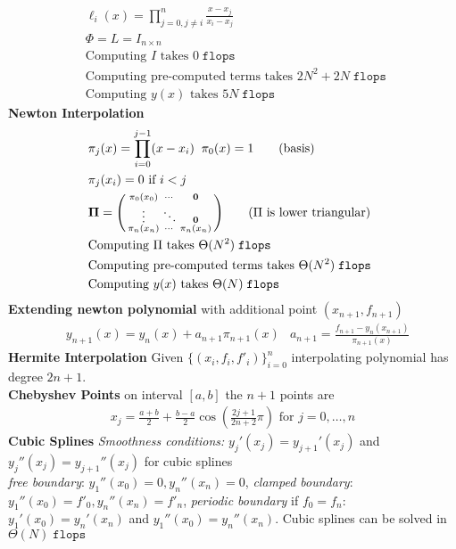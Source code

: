 \documentclass[letter, fleqn]{article}
\newcommand{\flops}{\texttt{flops }}
\begin{document}
\begin{multicols}{3}
\begin{align*}
        &\ell_i(x) = \prod_{j=0, j\neq i}^n \frac{x-x_j}{x_i-x_j} \tag{basis}\\
        &\Phi = L = I_{n\times n} \\
        &\text{Computing $I$ takes $0 \;\flops$}\\
        &\text{Computing pre-computed terms takes $2N^2 + 2N \;\flops$}\\
        &\text{Computing $y(x)$ takes $5N \;\flops$}
    \end{align*}
    \textbf{Newton Interpolation}
    \begin{align*}
        &\pi_j(x) = \prod_{i=0}^{j-1} (x-x_i)\;\; \pi_0(x) = 1 \tag{basis}\\
        &\pi_j(x_i) = 0 \text{ if $i < j$} \\
        &\mathbf{\Pi} = \smqty(
        \pi_0(x_0) & \cdots &\mathbf{0}\\
        \vdots & \ddots & \mathbf{0}\\
        \pi_n(x_n) & \cdots & \pi_n(x_n)
        ) \tag{$\Pi$ is lower triangular}\\
        &\text{Computing $\Pi$ takes $\Theta(N^2) \;\flops$}\\
        &\text{Computing pre-computed terms takes $\Theta(N^2) \;\flops$}\\
        &\text{Computing $y(x)$ takes $\Theta(N) \;\flops$}
    \end{align*}
    \textbf{Extending newton polynomial} with additional point $(x_{n+1}, f_{n+1})$
    \begin{align*}
        &y_{n+1}(x) = y_n(x) + a_{n+1}\pi_{n+1}(x) & a_{n+1} = \frac{f_{n+1} - y_n(x_{n+1})}{\pi_{n+1}(x)}
    \end{align*}
    \textbf{Hermite Interpolation} Given $\{(x_i, f_i, f'_i)\}_{i=0}^n$ interpolating polynomial has degree $\boxed{2n+1}$.\\
    \textbf{Chebyshev Points} on interval $[a,b]$ the $n+1$ points are
    \begin{align*}
        x_j = \frac{a+b}{2} +\frac{b-a}{2}\cos(\frac{2j+1}{2n+2}\pi) \text{ for $j = 0, \ldots, n$}
    \end{align*}
    \textbf{Cubic Splines}
    \textit{Smoothness conditions:} $y_j'(x_j) = y_{j+1}'(x_j)$ and $y_j''(x_j) = y_{j+1}''(x_j)$ for cubic splines\\
    \textit{free boundary}: $y_1''(x_0) = 0, y_n''(x_n) = 0$,  \textit{clamped boundary}: $y_1''(x_0) = f'_0, y_n''(x_n) = f'_n$, \textit{periodic boundary} if $f_0 = f_n$: $y_1'(x_0) = y_n'(x_n)$ and $y_1''(x_0) = y_n''(x_n)$. Cubic splines can be solved in $\Theta(N) \;\flops$

\end{multicols}
\end{document}
